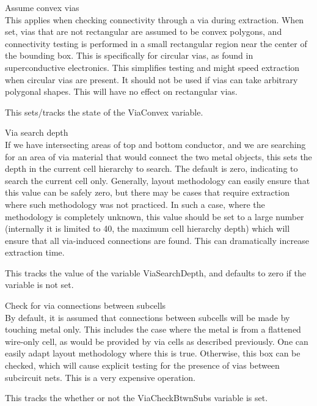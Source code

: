\begin{description}
\item{\cb Assume convex vias}\\
This applies when checking connectivity through a via during
extraction.  When set, vias that are not rectangular are assumed to be
convex polygons, and connectivity testing is performed in a small
rectangular region near the center of the bounding box.  This is
specifically for circular vias, as found in superconductive
electronics.  This simplifies testing and might speed extraction when
circular vias are present.  It should {\cb not} be used if vias can
take arbitrary polygonal shapes.  This will have no effect on
rectangular vias.

This sets/tracks the state of the {\et ViaConvex} variable.

\item{\cb Via search depth}\\
If we have intersecting areas of top and bottom conductor, and we are
searching for an area of via material that would connect the two metal
objects, this sets the depth in the current cell hierarchy to search. 
The default is zero, indicating to search the current cell only. 
Generally, layout methodology can easily ensure that this value can be
safely zero, but there may be cases that require extraction where such
methodology was not practiced.  In such a case, where the methodology
is completely unknown, this value should be set to a large number
(internally it is limited to 40, the maximum cell hierarchy depth)
which will ensure that all via-induced connections are found.  This
can dramatically increase extraction time.

This tracks the value of the variable {\et ViaSearchDepth}, and
defaults to zero if the variable is not set.

\item{\cb Check for via connections between subcells}\\
By default, it is assumed that connections between subcells will be
made by touching metal only.  This includes the case where the metal
is from a flattened wire-only cell, as would be provided by via cells
as described previously.  One can easily adapt layout methodology
where this is true.  Otherwise, this box can be checked, which will
cause explicit testing for the presence of vias between subcircuit
nets.  This is a very expensive operation.

This tracks the whether or not the {\et ViaCheckBtwnSubs} variable is
set.
\end{description}

